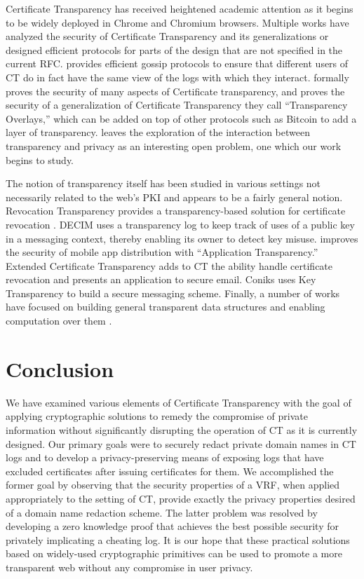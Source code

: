 \documentclass[letterpaper,twocolumn,10pt]{article}
\begin{document}
Certificate Transparency has received heightened academic attention as it begins to be widely deployed in Chrome and Chromium browsers. Multiple works have analyzed the security of Certificate Transparency and its generalizations or designed efficient protocols for parts of the design that are not specified in the current RFC. \cite{CSP+15} provides efficient gossip protocols to ensure that different users of CT do in fact have the same view of the logs with which they interact. \cite{DGHS16} formally proves the security of many aspects of Certificate transparency, and \cite{CM16} proves the security of a generalization of Certificate Transparency they call ``Transparency Overlays,'' which can be added on top of other protocols such as Bitcoin to add a layer of transparency.  \cite{CM16} leaves the exploration of the interaction between transparency and privacy as an interesting open problem, one which our work begins to study. 

The notion of transparency itself has been studied in various settings not necessarily related to the web's PKI and appears to be a fairly general notion. Revocation Transparency provides a transparency-based solution for certificate revocation \cite{RevTrans}. DECIM \cite{YRK15} uses a transparency log to keep track of uses of a public key in a messaging context, thereby enabling its owner to detect key misuse. \cite{FDP+14} improves the security of mobile app distribution with ``Application Transparency.''  Extended Certificate Transparency \cite{Rya14} adds to CT the ability handle certificate revocation and presents an application to secure email. Coniks \cite{MBB+15} uses Key Transparency to build a secure messaging scheme. Finally, a number of works have focused on building general transparent data structures and enabling computation over them \cite{Insynd}\cite{Balloon}\cite{Versum}. 

\section{Conclusion}
We have examined various elements of Certificate Transparency with the goal of applying cryptographic solutions to remedy the compromise of private information without significantly disrupting the operation of CT as it is currently designed. Our primary goals were to securely redact private domain names in CT logs and to develop a privacy-preserving means of exposing logs that have excluded certificates after issuing certificates for them. We accomplished the former goal by observing that the security properties of a VRF, when applied appropriately to the setting of CT, provide exactly the privacy properties desired of a domain name redaction scheme. The latter problem was resolved by developing a zero knowledge proof that achieves the best possible security for privately implicating a cheating log. It is our hope that these practical solutions based on widely-used cryptographic primitives can be used to promote a more transparent web without any compromise in user privacy. 
\end{document}
